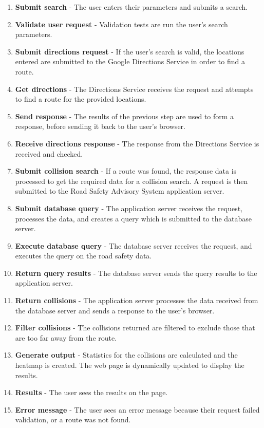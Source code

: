 \documentclass[authoryearcitations]{UoYCSproject}
\begin{document}
\begin{enumerate}
	\item \textbf{Submit search} - The user enters their parameters and submits a search.
	\item \textbf{Validate user request} - Validation tests are run the user's search parameters.
	\item \textbf{Submit directions request} - If the user's search is valid, the locations entered are submitted to the Google Directions Service in order to find a route.
	\item \textbf{Get directions} - The Directions Service receives the request and attempts to find a route for the provided locations.
	\item \textbf{Send response} - The results of the previous step are used to form a response, before sending it back to the user's browser.
	\item \textbf{Receive directions response} - The response from the Directions Service is received and checked.
	\item \textbf{Submit collision search} - If a route was found, the response data is processed to get the required data for a collision search. A request is then submitted to the Road Safety Advisory System application server.
	\item \textbf{Submit database query} -  The application server receives the request, processes the data, and creates a query which is submitted to the database server.
	\item \textbf{Execute database query} - The database server receives the request, and executes the query on the road safety data.
	\item \textbf{Return query results} - The database server sends the query results to the application server.
	\item \textbf{Return collisions} - The application server processes the data received from the database server and sends a response to the user's browser.
	\item \textbf{Filter collisions} - The collisions returned are filtered to exclude those that are too far away from the route.
	\item \textbf{Generate output} - Statistics for the collisions are calculated and the heatmap is created. The web page is dynamically updated to display the results.
	\item \textbf{Results} - The user sees the results on the page.
	\item \textbf{Error message} - The user sees an error message because their request failed validation, or a route was not found.
\end{enumerate}
\end{document}
